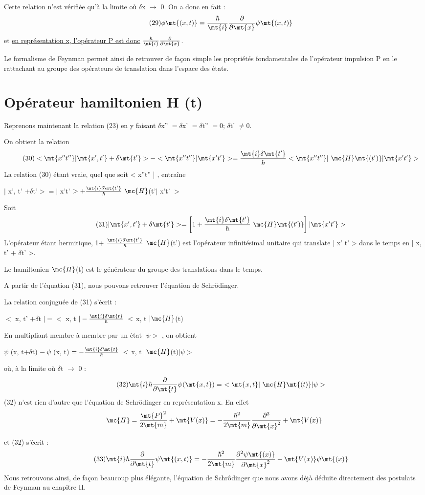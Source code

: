 Cette relation n'est vérifiée qu'à la limite où $\delta$x $\to$ 0. On a donc en fait :
\[
\tag{29}\phi\mt{(x,t)}=\frac{\hbar}{\mt{i}}\frac{\partial}{\partial\mt{x}}\psi\mt{(x,t)}
\]
et \ul{en représentation x, l'opérateur P est donc} $\frac{\hbar}{\mt{i}}\frac{\partial}{\partial\mt{x}}$.

 

Le formalisme de Feynman permet ainsi de retrouver de façon
simple les propriétés fondamentales de l'opérateur impulsion P en le rattachant au groupe des opérateurs de translation dans l'espace des états.
\section{Opérateur hamiltonien H (t)}%
Reprenons maintenant la relation (23) en y faisant
$\delta$x'' $=\delta$x' $=\delta$t'' $= 0$; $\delta$t' $\neq 0$.

On obtient la relation
\[
\tag{30}<\mt{x'' t'' }| \mt{x', t'}+\delta\mt{t'}> - <\mt{ x''t'' }|\mt{ x't' }>=
\frac{\mt{i}\delta\mt{t'}}{\hbar}<\mt{ x''t'' }|\ \mc{H}\mt{(t') }|\mt{ x't' }>
\]
La relation (30) étant vraie, quel que soit < x''t'' | , entraîne
\begin{center}
$|$ x', t' $+\delta$t'$>=|$ x't' $>+
\frac{\mt{i}\delta\mt{t'}}{\hbar}\ \mc{H}$(t'$|$ x't' $>$
\end{center}
Soit
\[
\tag{31}|\mt{ x', t'}+\delta\mt{t'}>=\left[1+
\frac{\mt{i}\delta\mt{t'}}{\hbar}\ \mc{H}\mt{(t') }\right]|\mt{ x't' }>
\]
L'opérateur  étant hermitique, 1+
$\frac{\mt{i}\delta\mt{t'}}{\hbar}$ $\mc{H}$(t') est l'opérateur
infinitésimal unitaire qui translate | x' t' > dans le temps en
| x, t' + $\delta$t' >.

Le hamiltonien $\mc{H}$(t) est le générateur du groupe des translations dans le
temps.

A partir de l'équation (31), nous pouvons retrouver l'équation
de Schrödinger.

La relation conjuguée de (31) s'écrit :
\begin{center}
$<$ x, t' $+\delta$t $|=<$ x, t $|-
\frac{\mt{i}\delta\mt{t}}{\hbar}\ <$ x, t $|\mc{H}$(t)
\end{center}

En multipliant membre à membre par un état $| \psi >$ , on obtient
\begin{center}
$\psi$ (x, t$+\delta$t) $-\ \psi$ (x, t) $=
-\frac{\mt{i}\delta\mt{t}}{\hbar}\ <$ x, t $|\mc{H}$(t)$| \psi >$
\end{center}
où, à la limite où $\delta$t $\to$ 0 :
\[
\tag{32}\mt{i}\hbar\frac{\partial}{\partial\mt{t}}\psi( \mt{x, t} )=
\ <\mt{ x, t }|\ \mc{H}\mt{(t) }|\psi>
\]
(32) n'est rien d'autre que l'équation de Schrödinger en représentation x.
En effet
\[
\mc{H}=\frac{\mt{P}^2}{2\mt{m}}+\mt{V(x)}=
-\frac{\hbar^2}{2\mt{m}}\frac{\partial^2}{\partial\mt{x}^2}+\mt{V(x)}
\]


et (32) s'écrit :
\[
\tag{33}\mt{i}\hbar\frac{\partial}{\partial\mt{t}}\psi\mt{(x,t)}=
-\frac{\hbar^2}{2\mt{m}}\frac{\partial^2\psi\mt{(x)}}{\partial\mt{x}^2}+\mt{V(x)}\psi\mt{(x)}
\]
Nous retrouvons ainsi, de façon beaucoup plus élégante, l'équation de
Schrôdinger que nous avons déjà déduite directement des postulats de
Feynman au chapitre II.

